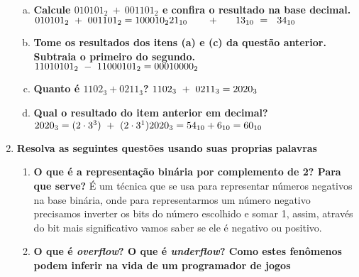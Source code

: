 \documentclass{article}
\begin{document}
\begin{enumerate}
\begin{enumerate}[(a)]
          \item \textbf{Calcule $ 010101_{2} \ + \ 001101_{2} $ e confira o resultado na base decimal.}
          \begin{math}
            \\ 010101_{2} \ + \ 001101_{2} = 100010_{2}
            \\ 21_{10} \ \ \ \ \ \  + \ \ \ \ \ 13_{10} \  = \ \ 34_{10}
          \end{math}
          \item \textbf{Tome os resultados dos itens (a) e (c) da questão anterior. Subtraia o primeiro do segundo.}
          \begin{math}
            \\ 11010101_{2} \ - \
               11000101_{2} = 00010000_{2}
          \end{math}
          \item \textbf{Quanto é $ 1102_{3} + 0211_{3}$?}
          \begin{math}
            \\ 1102_{3} \ + \
               0211_{3} = 2020_{3}
          \end{math}
          \item \textbf{Qual o resultado do item anterior em decimal?}
          \begin{math}
            \\ 2020_{3} = (2 \cdot 3^{3}) \ + \ (2 \cdot 3^{1})
            \\ 2020_{3} = 54_{10} + 6_{10} = 60_{10}
          \end{math}
        \end{enumerate}
        \item \textbf{Resolva as seguintes questões usando suas proprias palavras}
        \begin{enumerate}
          \item \textbf{O que é a representação binária por complemento de 2? Para que serve?}
          \linebreak É um técnica que se usa para representar números negativos na base binária, onde para representarmos um número negativo precisamos inverter os bits do número escolhido e somar 1, assim, através do bit mais significativo vamos saber se ele é negativo ou positivo.
          \item \textbf{O que é \textit{overflow}? O que é \textit{underflow}? Como estes fenômenos podem inferir na vida de um programador de jogos }
          \begin{itemize}

\end{itemize}
\end{enumerate}
\end{enumerate}
\end{document}
